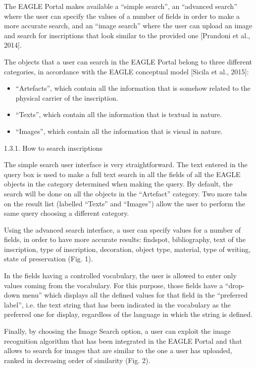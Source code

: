 \documentclass[amsthm,ebook]{saparticle}
\begin{document}
The EAGLE Portal makes available a “simple search”, an “advanced search” where the user can specify the values of a
number of fields in order to make a more accurate search, and an “image search” where the user can upload an image and
search for inscriptions that look similar to the provided one [Prandoni et al., 2014]. 

The objects that a user can search in the EAGLE Portal belong to three different categories, in accordance with the
EAGLE conceptual model [Sicila et al., 2015]:

\begin{itemize}
\item “Artefacts”, which contain all the information that is somehow related to the physical carrier of the inscription.
\item “Texts”, which contain all the information that is textual in nature.
\item “Images”, which contain all the information that is visual in nature.
\end{itemize}

\bigskip

1.3.1. How to search inscriptions


\bigskip

The simple search user interface is very straightforward. The text entered in the query box is used to make a full text
search in all the fields of all the EAGLE objects in the category determined when making the query. By default, the
search will be done on all the objects in the “Artefact” category. Two more tabs on the result list (labelled “Texts”
and “Images”) allow the user to perform the same query choosing a different category.

Using the advanced search interface, a user can specify values for a number of fields, in order to have more accurate
results: findspot, bibliography, text of the inscription, type of inscription, decoration, object type, material, type
of writing, state of preservation (Fig. 1).

In the fields having a controlled vocabulary, the user is allowed to enter only values coming from the vocabulary. For
this purpose, those fields have a “drop-down menu” which displays all the defined values for that field in the
“preferred label”, i.e. the text string that has been indicated in the vocabulary as the preferred one for display,
regardless of the language in which the string is defined. 

Finally, by choosing the Image Search option, a user can exploit the image recognition algorithm that has been
integrated in the EAGLE Portal and that allows to search for images that are similar to the one a user has uploaded,
ranked in decreasing order of similarity (Fig. 2).
\end{document}
